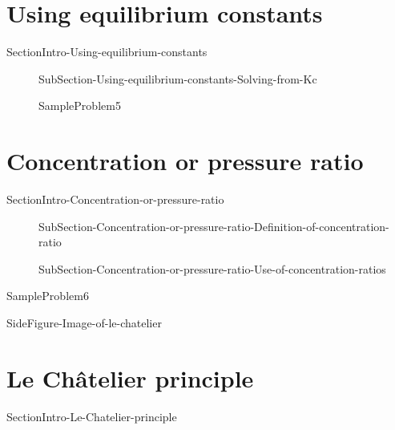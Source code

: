 \documentclass[main.tex]{subfiles}
\newcommand\chapterlabel{Ch-equilibrium}\setcounter{figurenewcounter}{0}\setcounter{tablenewcounter}{0}\setcounter{formulanewcounter}{0}
\begin{document}
\section{ {Using equilibrium constants}}   {SectionIntro-Using-equilibrium-constants}



   
   \sloppy
\begin{description}
\item[]{SubSection-Using-equilibrium-constants-Solving-from-Kc}



  {SampleProblem5}
\end{description}
 



\section{ Concentration or pressure ratio}
   {SectionIntro-Concentration-or-pressure-ratio}
\sloppy\begin{description}

\item[] {SubSection-Concentration-or-pressure-ratio-Definition-of-concentration-ratio}



\item[] {SubSection-Concentration-or-pressure-ratio-Use-of-concentration-ratios}


\end{description}
  {SampleProblem6}










{SideFigure-Image-of-le-chatelier}

\section{ {Le Ch\^{a}telier principle}}
   {SectionIntro-Le-Chatelier-principle}
\end{document}
